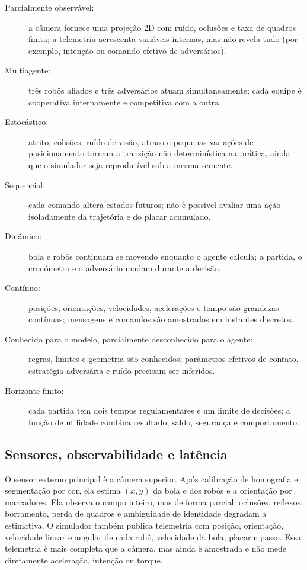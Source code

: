 \documentclass[12pt,a4paper]{article}
\begin{document}
\begin{description}
  \item[Parcialmente observ\'avel:] a c\^amera fornece uma proje\c{c}\~ao 2D com ru\'ido, oclus\~oes e taxa de quadros finita; a telemetria acrescenta vari\'aveis internas, mas n\~ao revela tudo (por exemplo, inten\c{c}\~ao ou comando efetivo de advers\'arios).
  \item[Multiagente:] tr\^es rob\^os aliados e tr\^es advers\'arios atuam simultaneamente; cada equipe \`e cooperativa internamente e competitiva com a outra.
  \item[Estoc\'astico:] atrito, colis\~oes, ru\'ido de vis\~ao, atraso e pequenas varia\c{c}\~oes de posicionamento tornam a transi\c{c}\~ao n\~ao determin\'istica na pr\'atica, ainda que o simulador seja reprodut\'ivel sob a mesma semente.
  \item[Sequencial:] cada comando altera estados futuros; n\~ao \`e poss\'ivel avaliar uma a\c{c}\~ao isoladamente da trajet\'oria e do placar acumulado.
  \item[Din\^amico:] bola e rob\^os continuam se movendo enquanto o agente calcula; a partida, o cron\^ometro e o advers\'ario mudam durante a decis\~ao.
  \item[Cont\'inuo:] posi\c{c}\~oes, orienta\c{c}\~oes, velocidades, acelera\c{c}\~oes e tempo s\~ao grandezas cont\'inuas; mensagens e comandos s\~ao amostrados em instantes discretos.
  \item[Conhecido para o modelo, parcialmente desconhecido para o agente:] regras, limites e geometria s\~ao conhecidos; par\^ametros efetivos de contato, estrat\'egia advers\'aria e ru\'ido precisam ser inferidos.
  \item[Horizonte finito:] cada partida tem dois tempos regulamentares e um limite de decis\~oes; a fun\c{c}\~ao de utilidade combina resultado, saldo, seguran\c{c}a e comportamento.
\end{description}

\subsection{Sensores, observabilidade e lat\^encia}

O sensor externo principal \`e a c\^amera superior. Ap\'os calibra\c{c}\~ao de homografia e segmenta\c{c}\~ao por cor, ela estima $(x,y)$ da bola e dos rob\^os e a orienta\c{c}\~ao por marcadores. Ela observa o campo inteiro, mas de forma parcial: oclus\~oes, reflexos, borramento, perda de quadros e ambiguidade de identidade degradam a estimativa. O simulador tamb\'em publica telemetria com posi\c{c}\~ao, orienta\c{c}\~ao, velocidade linear e angular de cada rob\^o, velocidade da bola, placar e passo. Essa telemetria \`e mais completa que a c\^amera, mas ainda \`e amostrada e n\~ao mede diretamente acelera\c{c}\~ao, inten\c{c}\~ao ou torque.
\end{document}
